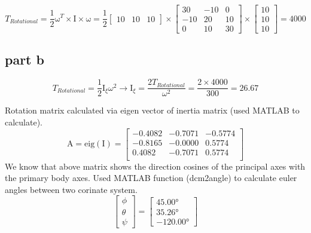 \begin{equation}
T_{Rotational} = \dfrac{1}{2}\boldsymbol{\mathrm{\omega}}^T\times \boldsymbol{\mathrm{I}} \times \boldsymbol{\mathrm{\omega}} = \dfrac{1}{2} \begin{bmatrix}
    10&
    10&
    10
\end{bmatrix}\times
\begin{bmatrix}
    30 & -10 & 0 \\
    -10 & 20 & 10\\
    0 & 10 & 30
\end{bmatrix}\times
\begin{bmatrix}
    10\\
    10\\
    10
\end{bmatrix} = 4000
\end{equation}
\subsection{part b}
\begin{equation}
    T_{Rotational} = \dfrac{1}{2} \mathrm{I}_{\xi} \omega^2 \rightarrow \mathrm{I}_{\xi} = \dfrac{2T_{Rotational}}{\omega^2} = \dfrac{2\times 4000}{300} = 26.67
\end{equation}

Rotation matrix calculated via eigen vector of inertia matrix (used MATLAB to calculate).
\begin{equation}
    \boldsymbol{\mathrm{A}} = \mathrm{eig}(\boldsymbol{\mathrm{I}}) = \begin{bmatrix}
        -0.4082&   -0.7071&   -0.5774\\
        -0.8165&   -0.0000&    0.5774\\
         0.4082&   -0.7071&    0.5774\\
    \end{bmatrix}
\end{equation}
We know that above matrix shows the direction cosines of the principal axes with the primary body axes. Used MATLAB function (dcm2angle) to calculate euler angles between two corinate system.
$$
\begin{bmatrix}
    \phi\\
    \theta\\
    \psi 
\end{bmatrix} = \begin{bmatrix}
  \ang{45.00}\\
  \ang{35.26}\\
  \ang{-120.00}
\end{bmatrix}
$$

